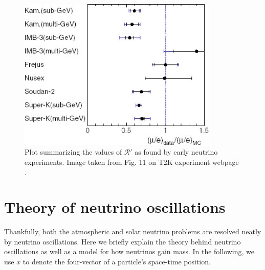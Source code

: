 \begin{figure}
  \centering
  \includegraphics[width=0.85\textwidth,height=0.25\textheight,keepaspectratio]
                {pictures/dblratio.jpg}
  \vspace*{10mm}
  \caption{Plot summarizing the values of $\mathcal{R}'$ as found by early
           neutrino experiments. Image taken from Fig. 11 on T2K experiment
           webpage \cite{T2K}.}
  \label{fig:rprime}
\end{figure}

\section{Theory of neutrino oscillations}
Thankfully, both the atmospheric and solar neutrino problems are resolved
neatly by neutrino oscillations.
Here we briefly explain the theory behind neutrino oscillations as well as a
model for how neutrinos gain mass. In the following, we use $x$ to denote
the four-vector of a particle's space-time position.

